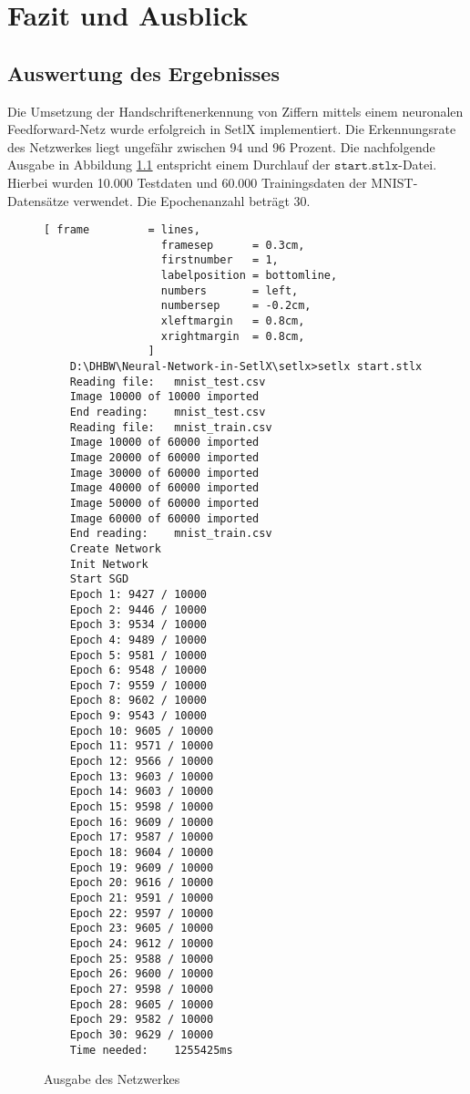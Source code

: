 \chapter{Fazit und Ausblick}

\section{Auswertung des Ergebnisses}
Die Umsetzung der Handschriftenerkennung von Ziffern mittels einem neuronalen Feedforward-Netz wurde erfolgreich in SetlX implementiert. Die Erkennungsrate des Netzwerkes liegt ungefähr zwischen 94 und 96 Prozent. Die nachfolgende Ausgabe in Abbildung \ref{fig:ausgabe_netzwerk} entspricht einem Durchlauf der $\mathtt{start.stlx}$-Datei. Hierbei wurden 10.000 Testdaten und 60.000 Trainingsdaten der MNIST-Datensätze verwendet. Die Epochenanzahl beträgt 30.

\begin{figure}
\begin{Verbatim}[ frame         = lines, 
                  framesep      = 0.3cm, 
                  firstnumber   = 1,
                  labelposition = bottomline,
                  numbers       = left,
                  numbersep     = -0.2cm,
                  xleftmargin   = 0.8cm,
                  xrightmargin  = 0.8cm,
                ]
    D:\DHBW\Neural-Network-in-SetlX\setlx>setlx start.stlx
    Reading file:   mnist_test.csv
    Image 10000 of 10000 imported
    End reading:    mnist_test.csv
    Reading file:   mnist_train.csv
    Image 10000 of 60000 imported
    Image 20000 of 60000 imported
    Image 30000 of 60000 imported
    Image 40000 of 60000 imported
    Image 50000 of 60000 imported
    Image 60000 of 60000 imported
    End reading:    mnist_train.csv
    Create Network
    Init Network
    Start SGD
    Epoch 1: 9427 / 10000
    Epoch 2: 9446 / 10000
    Epoch 3: 9534 / 10000
    Epoch 4: 9489 / 10000
    Epoch 5: 9581 / 10000
    Epoch 6: 9548 / 10000
    Epoch 7: 9559 / 10000
    Epoch 8: 9602 / 10000
    Epoch 9: 9543 / 10000
    Epoch 10: 9605 / 10000
    Epoch 11: 9571 / 10000
    Epoch 12: 9566 / 10000
    Epoch 13: 9603 / 10000
    Epoch 14: 9603 / 10000
    Epoch 15: 9598 / 10000
    Epoch 16: 9609 / 10000
    Epoch 17: 9587 / 10000
    Epoch 18: 9604 / 10000
    Epoch 19: 9609 / 10000
    Epoch 20: 9616 / 10000
    Epoch 21: 9591 / 10000
    Epoch 22: 9597 / 10000
    Epoch 23: 9605 / 10000
    Epoch 24: 9612 / 10000
    Epoch 25: 9588 / 10000
    Epoch 26: 9600 / 10000
    Epoch 27: 9598 / 10000
    Epoch 28: 9605 / 10000
    Epoch 29: 9582 / 10000
    Epoch 30: 9629 / 10000
    Time needed:    1255425ms		
\end{Verbatim}
\vspace*{-0.3cm}
\caption{Ausgabe des Netzwerkes}
\label{fig:ausgabe_netzwerk}
\end{figure}

